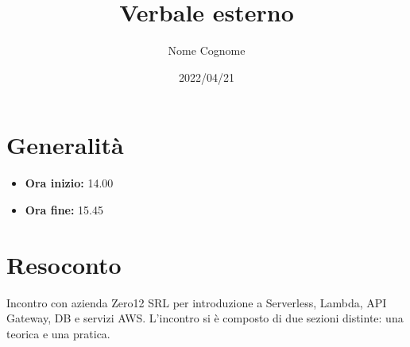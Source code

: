 \documentclass{classes/base}
\title{Verbale esterno}
\date{2022/04/21}
\author{Nome Cognome}
\renewcommand{\maketitle}{
    
}
\begin{document}
    \maketitle

    \section*{Generalità}
    \begin{itemize}
        \item \textbf{Ora inizio:} 14.00
        \item \textbf{Ora fine:} 15.45
    \end{itemize}

    \section*{Resoconto}
    Incontro con azienda Zero12 SRL per introduzione a Serverless, Lambda, API Gateway, DB e servizi AWS.
    L'incontro si è composto di due sezioni distinte: una teorica e una pratica.
\end{document}
